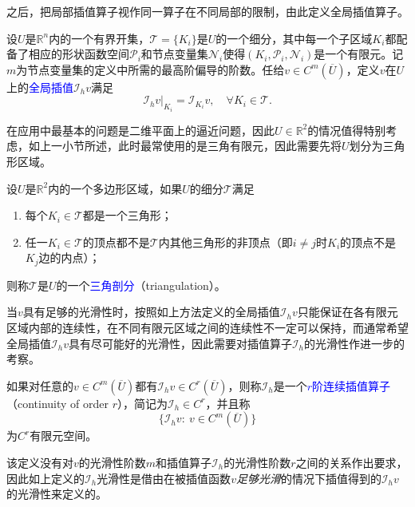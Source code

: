 \documentclass[a4paper,10pt]{ctexart}
\begin{document}
之后，把局部插值算子视作同一算子在不同局部的限制，由此定义全局插值算子。

\begin{definition}
    设$ U $是$ \mathbb{R}^n $内的一个有界开集，$ \mathcal{T}=\{K_i\} $是$ U $的一个细分，其中每一个子区域$ K_i $都配备了相应的形状函数空间$ \mathcal{P}_i $和节点变量集$ \mathcal{N}_i $使得$ (K_i,\mathcal{P}_i,\mathcal{N}_i) $是一个有限元。记$ m $为节点变量集的定义中所需的最高阶偏导的阶数。任给$ v\in C^m(\overline{U}) $，定义$ v $在$ U $上的\textcolor{blue}{全局插值}$ \mathcal{I}_h v $满足
    \begin{equation}
        \mathcal{I}_h v|_{K_i} = \mathcal{I}_{K_i} v,\quad \forall K_i\in \mathcal{T}.
    \end{equation}
\end{definition}

在应用中最基本的问题是二维平面上的逼近问题，因此$ U\in \mathbb{R}^2 $的情况值得特别考虑，如上一小节所述，此时最常使用的是三角有限元，因此需要先将$ U $划分为三角形区域。

\begin{definition}
    设$ U $是$ \mathbb{R}^2 $内的一个多边形区域，如果$ U $的细分$ \mathcal{T} $满足
    \begin{enumerate}
        \item 每个$ K_i\in \mathcal{T} $都是一个三角形；
        \item 任一$ K_i\in \mathcal{T} $的顶点都不是$ \mathcal{T} $内其他三角形的非顶点（即$ i\ne j $时$ K_i $的顶点不是$ K_j $边的内点）；
    \end{enumerate}
    则称$ \mathcal{T} $是$ U $的一个\textcolor{blue}{三角剖分}（triangulation）。
\end{definition}

当$ v $具有足够的光滑性时，按照如上方法定义的全局插值$ \mathcal{I}_h v $只能保证在各有限元区域内部的连续性，在不同有限元区域之间的连续性不一定可以保持，而通常希望全局插值$ \mathcal{I}_h v $具有尽可能好的光滑性，因此需要对插值算子$ \mathcal{I}_h $的光滑性作进一步的考察。

\begin{definition}
    如果对任意的$ v\in C^m(\overline{U}) $都有$ \mathcal{I}_h v\in C^r(\overline{U}) $，则称$ \mathcal{I}_h $是一个\textcolor{blue}{$ r $阶连续插值算子}（continuity of order $ r $），简记为$ \mathcal{I}_h\in C^r $，并且称
    \begin{equation}
        \{\mathcal{I}_h v:\ v\in C^m(\overline{U})\}
    \end{equation}
    为$ C^r $有限元空间。
\end{definition}
\noindent 该定义没有对$ v $的光滑性阶数$ m $和插值算子$ \mathcal{I}_h $的光滑性阶数$ r $之间的关系作出要求，因此如上定义的$ \mathcal{I}_h $光滑性是借由在被插值函数$ v $\emph{足够光滑}的情况下插值得到的$ \mathcal{I}_hv $的光滑性来定义的。
\end{document}
